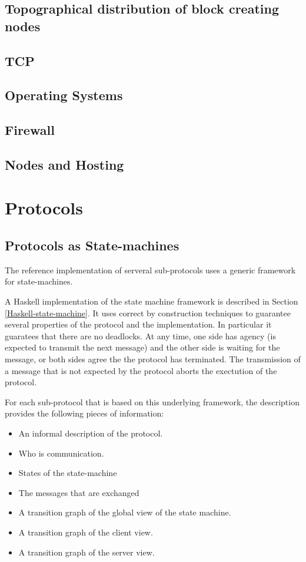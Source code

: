 \documentclass{report}
\theoremstyle{definition}{
  \newtheorem{lemma}{Lemma}[section] %
  \newtheorem{definition}[lemma]{Definition}
}
\theoremstyle{theorem}{
  \newtheorem{invariant}[lemma]{Invariant}
  \newtheorem{proofobligation}[lemma]{Proof Obligation}
}
\numberwithin{equation}{lemma}
\begin{document}
\section{Topographical distribution of block creating nodes}
\section{TCP}

\section{Operating Systems}
\section{Firewall}
\section{Nodes and Hosting}

\chapter{Protocols}
\section{Protocols as State-machines}
The reference implementation of serveral sub-protocols uses a generic framework
for state-machines.

A Haskell implementation of the state machine framework is described in Section
\ref{Haskell-state-machine}. It uses correct by construction techniques to guarantee
several properties of the protocol and the implementation.
In particular it guaratees that there are no deadlocks. At any time, one side has agency
(is expected to transmit the next message) and the other side is waiting for the message,
or both sides agree the the protocol has terminated.
The transmission of a message that is not expected by the protocol aborts the exectution
of the protocol.

For each sub-protocol that is based on this underlying framework, the description provides the
following pieces of information:

\begin{itemize}
\item An informal description of the protocol.
\item Who is communication.
\item States of the state-machine
\item The messages that are exchanged
\item A transition graph of the global view of the state machine.
\item A transition graph of the client view.
\item A transition graph of the server view.
\end{itemize}
\end{document}

